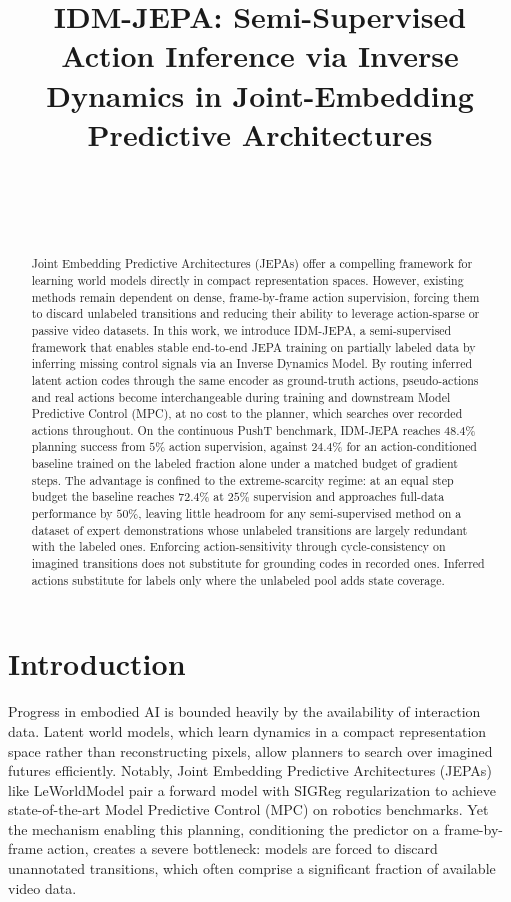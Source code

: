 \documentclass{article}
\title{IDM-JEPA: Semi-Supervised Action Inference via Inverse Dynamics
in Joint-Embedding Predictive Architectures}
\author{%
  \todo{Author} \\
  \todo{Affiliation} \\
  \texttt{\todo{email}} \\
}
\begin{document}
\maketitle

\begin{abstract}
Joint Embedding Predictive Architectures (JEPAs) offer a compelling framework for
learning world models directly in compact representation spaces. However, existing
methods remain dependent on dense, frame-by-frame action supervision, forcing them
to discard unlabeled transitions and reducing their ability to leverage
action-sparse or passive video datasets. In this work, we introduce IDM-JEPA, a
semi-supervised framework that enables stable end-to-end JEPA training on partially
labeled data by inferring missing control signals via an Inverse Dynamics Model. By
routing inferred latent action codes through the same encoder as ground-truth
actions, pseudo-actions and real actions become interchangeable during training and
downstream Model Predictive Control (MPC), at no cost to the planner, which searches
over recorded actions throughout. On the continuous PushT benchmark, IDM-JEPA reaches
$48.4\%$ planning success from $5\%$ action supervision, against $24.4\%$ for an
action-conditioned baseline trained on the labeled fraction alone under a matched
budget of gradient steps. The advantage is confined to the extreme-scarcity regime:
at an equal step budget the baseline reaches $72.4\%$ at $25\%$ supervision and
approaches full-data performance by $50\%$, leaving little headroom for any
semi-supervised method on a dataset of expert demonstrations whose unlabeled
transitions are largely redundant with the labeled ones. Enforcing
action-sensitivity through cycle-consistency on imagined transitions does not
substitute for grounding codes in recorded ones. Inferred actions substitute for
labels only where the unlabeled pool adds state coverage.
\end{abstract}

\section{Introduction}
\label{sec:intro}
Progress in embodied AI is bounded heavily by the availability of interaction data.
Latent world models, which learn dynamics in a compact representation space rather
than reconstructing pixels, allow planners to search over imagined futures
efficiently. Notably, Joint Embedding Predictive Architectures (JEPAs) like
LeWorldModel \citep{maes2026} pair a forward model with SIGReg regularization to achieve
state-of-the-art Model Predictive Control (MPC) on robotics benchmarks. Yet the
mechanism enabling this planning, conditioning the predictor on a frame-by-frame
action, creates a severe bottleneck: models are forced to discard unannotated
transitions, which often comprise a significant fraction of available video data.
\end{document}
